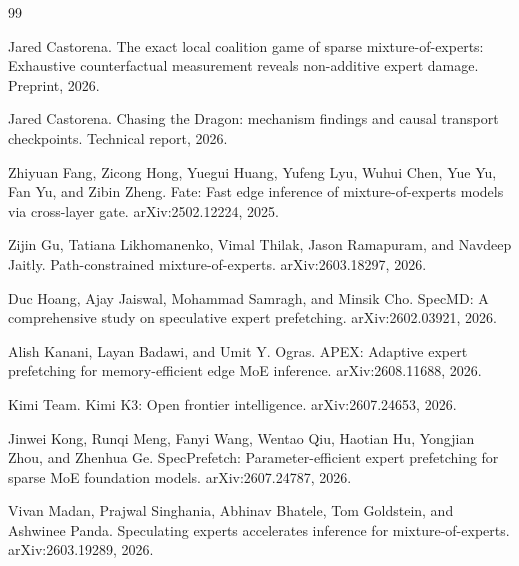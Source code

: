 \documentclass[11pt]{article}
\begin{document}
\begin{thebibliography}{99}

Jared Castorena.
\newblock The exact local coalition game of sparse mixture-of-experts: Exhaustive counterfactual measurement reveals non-additive expert damage.
\newblock Preprint, 2026.

Jared Castorena.
\newblock Chasing the Dragon: mechanism findings and causal transport checkpoints.
\newblock Technical report, 2026.

Zhiyuan Fang, Zicong Hong, Yuegui Huang, Yufeng Lyu, Wuhui Chen, Yue Yu, Fan Yu, and Zibin Zheng.
\newblock Fate: Fast edge inference of mixture-of-experts models via cross-layer gate.
\newblock arXiv:2502.12224, 2025.

Zijin Gu, Tatiana Likhomanenko, Vimal Thilak, Jason Ramapuram, and Navdeep Jaitly.
\newblock Path-constrained mixture-of-experts.
\newblock arXiv:2603.18297, 2026.

Duc Hoang, Ajay Jaiswal, Mohammad Samragh, and Minsik Cho.
\newblock SpecMD: A comprehensive study on speculative expert prefetching.
\newblock arXiv:2602.03921, 2026.

Alish Kanani, Layan Badawi, and Umit Y. Ogras.
\newblock APEX: Adaptive expert prefetching for memory-efficient edge MoE inference.
\newblock arXiv:2608.11688, 2026.

Kimi Team.
\newblock Kimi K3: Open frontier intelligence.
\newblock arXiv:2607.24653, 2026.

Jinwei Kong, Runqi Meng, Fanyi Wang, Wentao Qiu, Haotian Hu, Yongjian Zhou, and Zhenhua Ge.
\newblock SpecPrefetch: Parameter-efficient expert prefetching for sparse MoE foundation models.
\newblock arXiv:2607.24787, 2026.

Vivan Madan, Prajwal Singhania, Abhinav Bhatele, Tom Goldstein, and Ashwinee Panda.
\newblock Speculating experts accelerates inference for mixture-of-experts.
\newblock arXiv:2603.19289, 2026.


\end{thebibliography}
\end{document}
